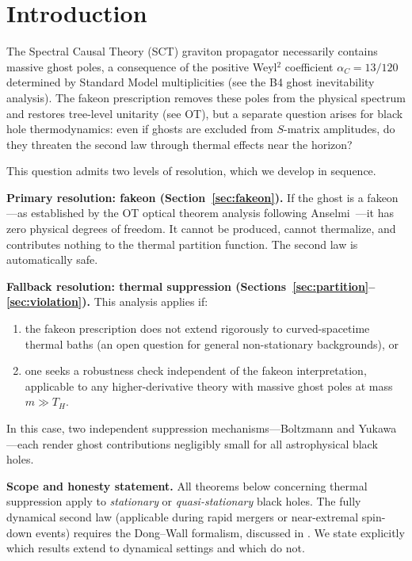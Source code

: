 \documentclass[11pt,a4paper]{article}
\newcommand{\Thr}{T_{\!\scriptscriptstyle H}}
\theoremstyle{plain}
\theoremstyle{definition}
\begin{document}
\section{Introduction}\label{sec:intro}

The Spectral Causal Theory (SCT) graviton propagator necessarily
contains massive ghost poles, a consequence of the positive Weyl${}^2$
coefficient $\alpha_C = 13/120$ determined by Standard Model
multiplicities (see the B4 ghost inevitability analysis).  The fakeon
prescription removes these poles from the physical spectrum and
restores tree-level unitarity (see OT), but a separate question
arises for black hole thermodynamics: even if ghosts are excluded from
$S$-matrix amplitudes, do they threaten the second law through thermal
effects near the horizon?

This question admits two levels of resolution, which we develop in
sequence.

\medskip\noindent
\textbf{Primary resolution: fakeon (Section~\ref{sec:fakeon}).}
If the ghost is a fakeon---as established by the OT optical theorem
analysis following Anselmi~\cite{AnselmiFakeon}---it has zero physical
degrees of freedom.  It cannot be produced, cannot thermalize, and
contributes nothing to the thermal partition function.  The second law
is automatically safe.

\medskip\noindent
\textbf{Fallback resolution: thermal suppression
(Sections~\ref{sec:partition}--\ref{sec:violation}).}
This analysis applies if:
\begin{enumerate}[label=(\alph*)]
  \item the fakeon prescription does not extend rigorously to
    curved-spacetime thermal baths (an open question for general
    non-stationary backgrounds), or
  \item one seeks a robustness check independent of the fakeon
    interpretation, applicable to any higher-derivative theory with
    massive ghost poles at mass $m \gg \Thr$.
\end{enumerate}
In this case, two independent suppression mechanisms---Boltzmann and
Yukawa---each render ghost contributions negligibly small for all
astrophysical black holes.

\medskip\noindent
\textbf{Scope and honesty statement.}
All theorems below concerning thermal suppression apply to
\emph{stationary} or \emph{quasi-stationary} black holes.  The fully
dynamical second law (applicable during rapid mergers or near-extremal
spin-down events) requires the Dong--Wall formalism, discussed in
.  We state explicitly which results extend to
dynamical settings and which do not.
\end{document}
